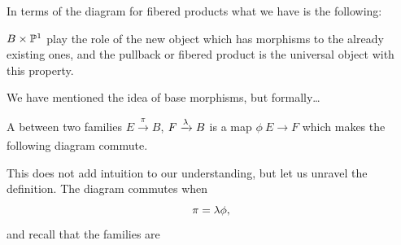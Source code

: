 \documentclass[12pt]{memoir}
\begin{document}
\begin{ptcb}
In terms of the diagram for fibered products what we have is the following:
\begin{center}
\end{center}
$B\times\mathbb{P}^1$ play the role of the new object which has morphisms to the already existing ones, and the pullback or fibered product is the universal object with this property.
\end{ptcb}

We have mentioned the idea of base morphisms, but formally\dots

\begin{Def}
    A  between two families $E\xrightarrow[]{\pi}B$, $F\xrightarrow[]{\lambda}B$ is a map $\phi\:E\to F$ which makes the following diagram commute.
    \begin{center}
    \end{center}
\end{Def}

This does not add intuition to our understanding, but let us unravel the definition. The diagram commutes when 
$$\pi=\lambda\phi,$$
and recall that the families are 
\end{document}
